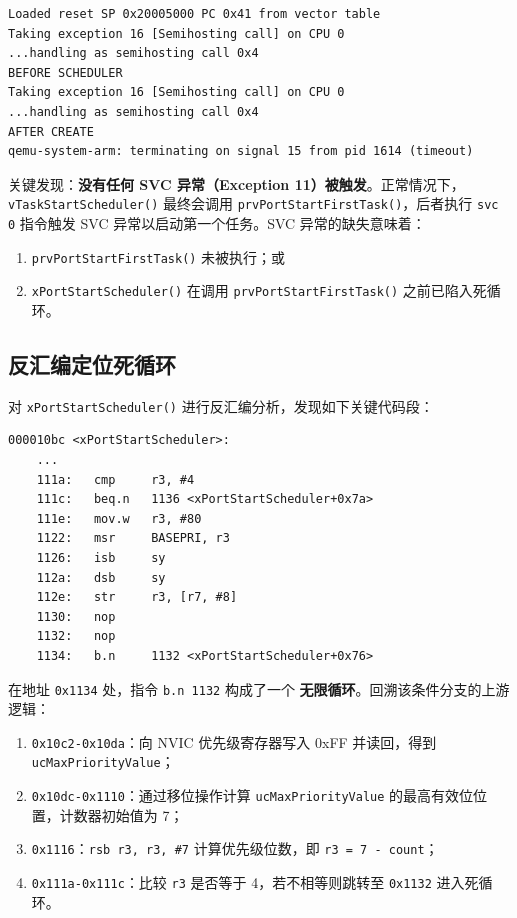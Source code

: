 \documentclass[12pt,a4paper]{ctexart}
\begin{document}
\begin{verbatim}
Loaded reset SP 0x20005000 PC 0x41 from vector table
Taking exception 16 [Semihosting call] on CPU 0
...handling as semihosting call 0x4
BEFORE SCHEDULER
Taking exception 16 [Semihosting call] on CPU 0
...handling as semihosting call 0x4
AFTER CREATE
qemu-system-arm: terminating on signal 15 from pid 1614 (timeout)
\end{verbatim}

关键发现：\textbf{没有任何 SVC 异常（Exception 11）被触发}。正常情况下，\texttt{vTaskStartScheduler()} 最终会调用 \texttt{prvPortStartFirstTask()}，后者执行 \texttt{svc 0} 指令触发 SVC 异常以启动第一个任务。SVC 异常的缺失意味着：
\begin{enumerate}[leftmargin=2em]
    \item \texttt{prvPortStartFirstTask()} 未被执行；或
    \item \texttt{xPortStartScheduler()} 在调用 \texttt{prvPortStartFirstTask()} 之前已陷入死循环。
\end{enumerate}

\subsection{反汇编定位死循环}

对 \texttt{xPortStartScheduler()} 进行反汇编分析，发现如下关键代码段：

\begin{verbatim}
000010bc <xPortStartScheduler>:
    ...
    111a:   cmp     r3, #4
    111c:   beq.n   1136 <xPortStartScheduler+0x7a>
    111e:   mov.w   r3, #80
    1122:   msr     BASEPRI, r3
    1126:   isb     sy
    112a:   dsb     sy
    112e:   str     r3, [r7, #8]
    1130:   nop
    1132:   nop
    1134:   b.n     1132 <xPortStartScheduler+0x76>
\end{verbatim}

在地址 \texttt{0x1134} 处，指令 \texttt{b.n 1132} 构成了一个 \textbf{无限循环}。回溯该条件分支的上游逻辑：

\begin{enumerate}[leftmargin=2em]
    \item \texttt{0x10c2-0x10da}：向 NVIC 优先级寄存器写入 0xFF 并读回，得到 \texttt{ucMaxPriorityValue}；
    \item \texttt{0x10dc-0x1110}：通过移位操作计算 \texttt{ucMaxPriorityValue} 的最高有效位位置，计数器初始值为 7；
    \item \texttt{0x1116}：\texttt{rsb r3, r3, \#7} 计算优先级位数，即 \texttt{r3 = 7 - count}；
    \item \texttt{0x111a-0x111c}：比较 \texttt{r3} 是否等于 4，若不相等则跳转至 \texttt{0x1132} 进入死循环。
\end{enumerate}
\end{document}
